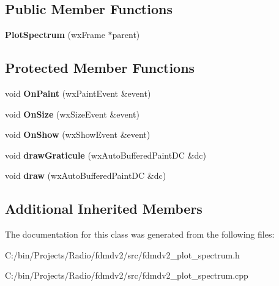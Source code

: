 \subsection*{Public Member Functions}
\begin{DoxyCompactItemize}
\item 
\hypertarget{class_plot_spectrum_acf2d5350a75a47ece11c0dc33399a0da}{{\bfseries Plot\-Spectrum} (wx\-Frame $\ast$parent)}\label{class_plot_spectrum_acf2d5350a75a47ece11c0dc33399a0da}

\end{DoxyCompactItemize}
\subsection*{Protected Member Functions}
\begin{DoxyCompactItemize}
\item 
\hypertarget{class_plot_spectrum_ac95b33dfd2838f6fc2a6791003b26d0a}{void {\bfseries On\-Paint} (wx\-Paint\-Event \&event)}\label{class_plot_spectrum_ac95b33dfd2838f6fc2a6791003b26d0a}

\item 
\hypertarget{class_plot_spectrum_aa104352673f08ff08c72bcf4729f23eb}{void {\bfseries On\-Size} (wx\-Size\-Event \&event)}\label{class_plot_spectrum_aa104352673f08ff08c72bcf4729f23eb}

\item 
\hypertarget{class_plot_spectrum_a40d38e7467b04ab2f958218f38209aab}{void {\bfseries On\-Show} (wx\-Show\-Event \&event)}\label{class_plot_spectrum_a40d38e7467b04ab2f958218f38209aab}

\item 
\hypertarget{class_plot_spectrum_a2d78efb58ea00ec8961a88632a54f357}{void {\bfseries draw\-Graticule} (wx\-Auto\-Buffered\-Paint\-D\-C \&dc)}\label{class_plot_spectrum_a2d78efb58ea00ec8961a88632a54f357}

\item 
\hypertarget{class_plot_spectrum_aeab5798a4f3bd55bd69045cc7b817d48}{void {\bfseries draw} (wx\-Auto\-Buffered\-Paint\-D\-C \&dc)}\label{class_plot_spectrum_aeab5798a4f3bd55bd69045cc7b817d48}

\end{DoxyCompactItemize}
\subsection*{Additional Inherited Members}


The documentation for this class was generated from the following files\-:\begin{DoxyCompactItemize}
\item 
C\-:/bin/\-Projects/\-Radio/fdmdv2/src/fdmdv2\-\_\-plot\-\_\-spectrum.\-h\item 
C\-:/bin/\-Projects/\-Radio/fdmdv2/src/fdmdv2\-\_\-plot\-\_\-spectrum.\-cpp\end{DoxyCompactItemize}
